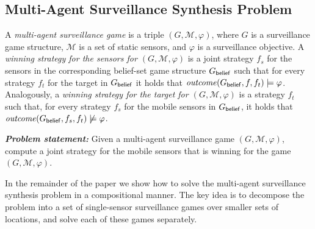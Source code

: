 \subsection{Multi-Agent Surveillance Synthesis Problem}
A \emph{multi-agent surveillance game} is a triple $(G,\mathcal M,\varphi)$, where $G$ is a surveillance game structure, $\mathcal M$ is a set of static sensors,  and $\varphi$ is a surveillance objective. A \emph{winning strategy for the sensors for $(G,\mathcal M,\varphi)$} is a joint strategy $f_s$ for the sensors in the corresponding belief-set game structure $G_{\mathsf{belief}}$ such that for every strategy $f_t$ for the target in $G_{\mathsf{belief}}$ it holds that $\mathit{outcome}(G_{\mathsf{belief}},f,f_t) \models \varphi$. Analogously, a \emph{winning strategy for the target for $(G,\mathcal M,\varphi)$} is a strategy $f_t$ such that, for every strategy $f_s$ for the mobile sensors in $G_{\mathsf{belief}}$, it holds that $\mathit{outcome}(G_{\mathsf{belief}},f_s,f_t) \not\models \varphi$.

{\textit{\textbf{Problem statement: }}} Given a multi-agent surveillance game $(G,\mathcal M,\varphi)$,  compute a joint strategy for the mobile sensors that is winning for the game $(G,\mathcal M,\varphi)$.

In the remainder of the paper we show how to solve the multi-agent surveillance synthesis problem in a compositional manner.  The key idea is to decompose the problem into a set of single-sensor surveillance games over smaller sets of locations, and solve each of these games separately. 

